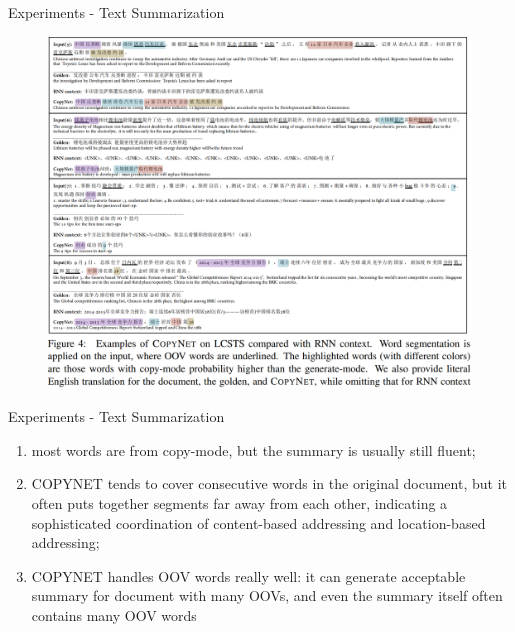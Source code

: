 \documentclass{beamer}
\begin{document}
\begin{frame}{Experiments - Text Summarization}
\begin{figure}
    \centering
    \includegraphics[height=0.9\textheight]{sum_ex2.PNG}
\end{figure}
\end{frame}

\begin{frame}{Experiments - Text Summarization}
    \begin{enumerate}
    \item most words are from copy-mode,
but the summary is usually still fluent; 
\item COPYNET
tends to cover consecutive words in the original
document, but it often puts together segments
far away from each other, indicating a sophisticated
coordination of content-based addressing
and location-based addressing; 
\item COPYNET
handles OOV words really well: it can generate
acceptable summary for document with many
OOVs, and even the summary itself often contains
many OOV words
\end{enumerate}
\end{frame}
\end{document}
